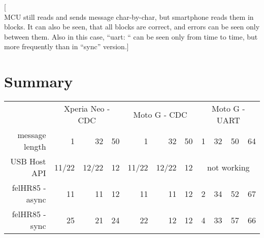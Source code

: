 [\\MCU still reads and sends message char-by-char, but smartphone reads them in
blocks. 
It can also be seen, that all blocks are correct, and errors can be
seen only between them. 
Also in this case, ``uart: `` can be seen only from time to time, but more
frequently than in ``sync'' version.]


\section{Summary}

\begin{center}
\begin{tabular}{r|r|r|r|r|r|r|r|r|r|r}
& \multicolumn{3}{c|}{Xperia Neo - CDC} & \multicolumn{3}{c|}{Moto G - CDC} &
\multicolumn{4}{c}{Moto G - UART} \\
message length & 1 & 32 & \hspace{3ex}50 & 
1 & 32 & \hspace{3ex}50 & \hspace{1ex}1 & 
32 & 50 & 64
\\
\hline
USB Host API & 
11/22 & 12/22 & 12 & 11/22 & 12/22 & 12 &
\multicolumn{4}{c}{\cellcolor{red!50}not working}
\\
felHR85 - async & 
11 & 11 & 12 & 11 & 11 & 12 & 2 & 34 & \cellcolor{yellow!50}52 & 67 \\
felHR85 - sync & 
25 & 21 & 24 & 22 & 12 & 12 & 4 & 33 & \cellcolor{yellow!50}57 & 66
\end{tabular}
\end{center}
